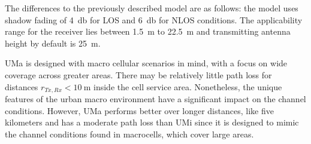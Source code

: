 The differences to the previously described model are as follows: the model uses shadow fading of \SI{4}{\decibel} for \ac{LOS} and \SI{6}{\decibel} for \ac{NLOS} conditions. The applicability range for the receiver lies between \SI{1.5}{\meter} to \SI{22.5}{\meter} and transmitting antenna height by default is \SI{25}{\meter}.


UMa is designed with macro cellular scenarios in mind, with a focus on wide coverage across greater areas. There may be relatively little path loss for distances $r_{Tx, Rx}< \SI{10}{\meter}$ inside the cell service area. Nonetheless, the unique features of the urban macro environment have a significant impact on the channel conditions. However, UMa performs better over longer distances, like five kilometers and has a moderate path loss than UMi since it is designed to mimic the channel conditions found in macrocells, which cover large areas.

